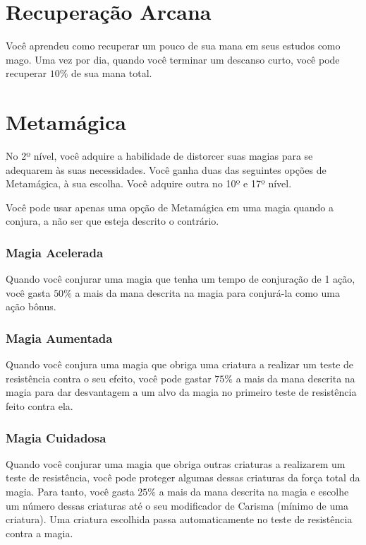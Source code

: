 \documentclass{RPG_Adventure}[2021/10/20]
\begin{document}
\section*{Recuperação Arcana}%

Você aprendeu como recuperar um pouco de sua mana em seus estudos como mago. Uma
vez por dia, quando você terminar um descanso curto, você pode recuperar $10\%$
de sua mana total.

\section*{Metamágica}%

No 2º nível, você adquire a habilidade de distorcer suas magias para se
adequarem às suas necessidades. Você ganha duas das seguintes opções de
Metamágica, à sua escolha. Você adquire outra no 10º e 17º nível.

Você pode usar apenas uma opção de Metamágica em uma magia quando a conjura, a
não ser que esteja descrito o contrário.

\subsubsection*{Magia Acelerada}%

Quando você conjurar uma magia que tenha um tempo de conjuração de 1 ação, você
gasta $50\%$ a mais da mana descrita na magia para conjurá-la como uma ação
bônus.

\subsubsection*{Magia Aumentada}%

Quando você conjura uma magia que obriga uma criatura a realizar um teste de
resistência contra o seu efeito, você pode gastar $75\%$ a mais da mana descrita
na magia para dar desvantagem a um alvo da magia no primeiro teste de
resistência feito contra ela.

\subsubsection*{Magia Cuidadosa}%

Quando você conjurar uma magia que obriga outras criaturas a realizarem um teste
de resistência, você pode proteger algumas dessas criaturas da força total da
magia. Para tanto, você gasta $25\%$ a mais da mana descrita na magia e escolhe
um número dessas criaturas até o seu modificador de Carisma (mínimo de uma
criatura). Uma criatura escolhida passa automaticamente no teste de resistência
contra a magia.
\end{document}
